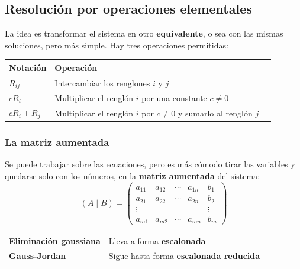 \documentclass[11pt,letterpaper]{article}
\begin{document}

\subsection*{Resolución por operaciones elementales}

La idea es transformar el sistema en otro \textbf{equivalente}, o sea
con las mismas soluciones, pero más simple. Hay tres operaciones
permitidas:

\begin{center}
\begin{tabular}{lll}
    \toprule
    \textbf{Notación} & \textbf{Operación} \\
    \midrule
    $R_{ij}$        & Intercambiar los renglones $i$ y $j$ \\
    $cR_i$          & Multiplicar el renglón $i$ por una constante
                      $c \neq 0$ \\
    $cR_i + R_j$    & Multiplicar el renglón $i$ por $c \neq 0$ y
                      sumarlo al renglón $j$ \\
    \bottomrule
\end{tabular}
\end{center}

\subsubsection*{La matriz aumentada}

Se puede trabajar sobre las ecuaciones, pero es más cómodo tirar las
variables y quedarse solo con los números, en la \textbf{matriz
aumentada} del sistema:
\[
    (A \mid B) =
    \left(\begin{array}{cccc|c}
      a_{11} & a_{12} & \cdots & a_{1n} & b_1 \\
      a_{21} & a_{22} & \cdots & a_{2n} & b_2 \\
      \vdots &        &        &        & \vdots \\
      a_{m1} & a_{m2} & \cdots & a_{mn} & b_m
    \end{array}\right)
\]

\begin{center}
\begin{tabular}{ll}
    \toprule
    \textbf{Eliminación gaussiana} & Lleva a forma \textbf{escalonada}
      \\
    \textbf{Gauss-Jordan} & Sigue hasta forma \textbf{escalonada
      reducida} \\
    \bottomrule
\end{tabular}
\end{center}
\end{document}
